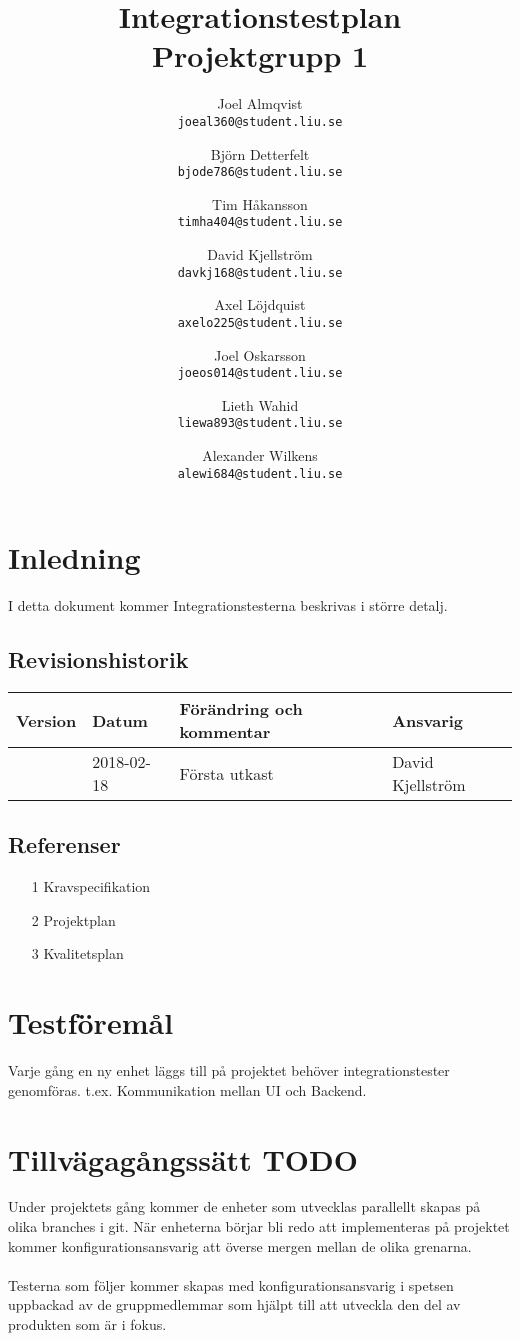 \documentclass[10pt]{article}
\title{Integrationstestplan\\
    \large Projektgrupp 1}
\author{
    Joel Almqvist\\
    \texttt{joeal360@student.liu.se}
    \and
    Björn Detterfelt\\
    \texttt{bjode786@student.liu.se}
    \and
    Tim Håkansson\\
    \texttt{timha404@student.liu.se}
    \and
    David Kjellström\\
    \texttt{davkj168@student.liu.se}
    \and
    Axel Löjdquist\\
    \texttt{axelo225@student.liu.se}
    \and
    Joel Oskarsson\\
    \texttt{joeos014@student.liu.se}
    \and
    Lieth Wahid\\
    \texttt{liewa893@student.liu.se}
    \and
    Alexander Wilkens\\
    \texttt{alewi684@student.liu.se}
}
\begin{document}
\maketitle
\pagebreak
\tableofcontents
\pagebreak

\section{Inledning}
     I detta dokument kommer Integrationstesterna beskrivas i större detalj.
	\subsection{Revisionshistorik}

	
	\begin{center}
 	   \begin{tabular}{| l | l | l |  l | }
 	       \hline
 	       \textbf{Version} & \textbf{Datum} & \textbf{Förändring och kommentar} & \textbf{Ansvarig} \\
 	       \hline
 	       \centering 0.1 & 2018-02-18 & Första utkast & David Kjellström\\
 	       \hline
 	   \end{tabular}
	\end{center}

  
	
	\subsection{Referenser}
		\begin{itemize}
		\item [1] Kravspecifikation
		\item [2] Projektplan
		\item [3] Kvalitetsplan
		\end{itemize}

	
\section{Testföremål}
	Varje gång en ny enhet läggs till på projektet behöver integrationstester genomföras. t.ex. Kommunikation mellan UI och Backend.
	
	
	
	



\section{Tillvägagångssätt {\color{red}TODO}}
	Under projektets gång kommer de enheter som utvecklas parallellt skapas på olika branches i git. När enheterna börjar bli redo att implementeras på projektet kommer konfigurationsansvarig att överse mergen mellan de olika grenarna.\\
	\\
	Testerna som följer kommer skapas med konfigurationsansvarig i spetsen uppbackad av de gruppmedlemmar som hjälpt till att utveckla den del av produkten som är i fokus.
\end{document}

